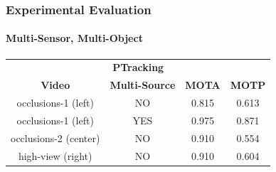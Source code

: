 \begin{frame}
	\frametitle{Experimental Evaluation}
	\framesubtitle{Multi-Sensor, Multi-Object}
	
	\vspace{0.1cm}
	
	\begin{center}
	\end{center}
	
	\vspace{-0.2cm}
	
	\footnotesize
	
	\begin{table}
		\centering
		\def\arraystretch{1.15}
		\setlength{\tabcolsep}{0.15cm}
		\begin{tabular}{cccc}
			\cline{1-4}
			\multicolumn{4}{c}{\textbf{PTracking}} \\ \cline{1-4}
			\textbf{Video} & \textbf{Multi-Source} & \textbf{MOTA} & \textbf{MOTP} \\
			\hline
			occlusions-1 (left) & NO & 0.815 & 0.613 \\
			\hline
			occlusions-1 (left) & YES & 0.975 & 0.871 \\
			\hline
			occlusions-2 (center) & NO & 0.910 & 0.554 \\
			\hline
			high-view (right) & NO & 0.910 & 0.604 \\
			\hline
		\end{tabular}
	\end{table}
	

\end{frame}
